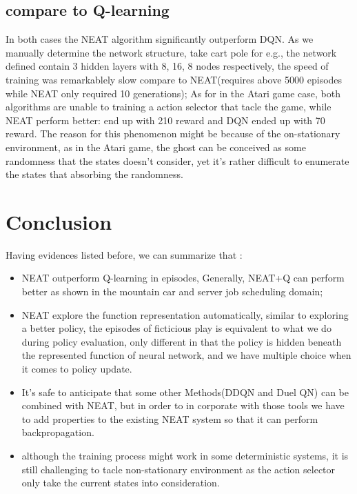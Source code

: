\documentclass{article}
\begin{document}
\subsection{compare to Q-learning}

In both cases the NEAT algorithm significantly outperform DQN. As we manually determine the network structure, take cart pole for e.g.,
the network defined contain 3 hidden layers with 8, 16, 8 nodes respectively, the speed of training was remarkablely slow compare to NEAT(requires above 5000 episodes while NEAT only required 10 generations);
As for in the Atari game case, both algorithms are unable to training a action selector that tacle the game, while NEAT perform better: end up with
210 reward and DQN ended up with 70 reward. The reason for this phenomenon might be because of the on-stationary environment, as in the Atari game,
the ghost can be conceived as some randomness that the states doesn't consider, yet it's rather difficult to enumerate the states that absorbing the randomness.


\section{Conclusion}

Having evidences listed before, we can summarize that :
\begin{itemize}
  \item NEAT outperform Q-learning in episodes, Generally, NEAT+Q can perform better as shown in the mountain car and server job scheduling domain; 
  \item NEAT explore the function representation automatically, similar to exploring a better policy, the episodes of ficticious play is equivalent to what we do during policy evaluation,
  only different in that the policy is hidden beneath the represented function of neural network, and we have multiple choice when it comes to policy update.
  \item It's safe to anticipate that some other Methods(DDQN and Duel QN) can be combined with NEAT, but in order to in corporate with those tools we have to add properties to the existing NEAT system
  so that it can perform backpropagation.
  \item  although the training process might work in some deterministic systems, it is still challenging to tacle non-stationary environment as the action selector only take 
  the current states into consideration.
\end{itemize}
\end{document}
